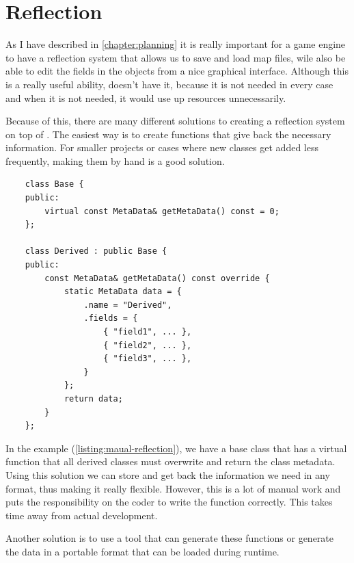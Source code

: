 \chapter{Reflection}\label{ch:reflection}

As I have described in \autoref{chapter:planning} it is really important for a game engine to have a reflection system that allows us to save and load map files, wile also be able to edit the fields in the objects from a nice graphical interface. Although this is a really useful ability, \Cpp doesn't have it, because it is not needed in every case and when it is not needed, it would use up resources unnecessarily.

Because of this, there are many different solutions to creating a reflection system on top of \Cpp. The easiest way is to create functions that give back the necessary information. For smaller projects or cases where new classes get added less frequently, making them by hand is a good solution.

\begin{listing}[!ht]
    \begin{verbatim}
    class Base {
    public:
        virtual const MetaData& getMetaData() const = 0;
    };

    class Derived : public Base {
    public:
        const MetaData& getMetaData() const override {
            static MetaData data = {
                .name = "Derived",
                .fields = {
                    { "field1", ... },
                    { "field2", ... },
                    { "field3", ... },
                }
            };
            return data;
        }
    };
    \end{verbatim}
    \caption{Example for a manual reflection function}
    \label{listing:maual-reflection}
\end{listing}

In the example (\autoref{listing:maual-reflection}), we have a base class that has a virtual function that all derived classes must overwrite and return the class metadata.
Using this solution we can store and get back the information we need in any format, thus making it really flexible.
However, this is a lot of manual work and puts the responsibility on the coder to write the function correctly.
This takes time away from actual development.

Another solution is to use a tool that can generate these functions or generate the data in a portable format that can be loaded during runtime.


